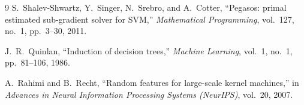 \documentclass[10pt,twocolumn,a4paper]{article}
\begin{document}
\begin{thebibliography}{9}
S.~Shalev-Shwartz, Y.~Singer, N.~Srebro, and A.~Cotter,
``Pegasos: primal estimated sub-gradient solver for SVM,''
\emph{Mathematical Programming}, vol.~127, no.~1, pp.~3--30, 2011.

J.~R.~Quinlan,
``Induction of decision trees,''
\emph{Machine Learning}, vol.~1, no.~1, pp.~81--106, 1986.

A.~Rahimi and B.~Recht,
``Random features for large-scale kernel machines,''
in \emph{Advances in Neural Information Processing Systems (NeurIPS)}, vol.~20, 2007.
\end{thebibliography}
\end{document}

